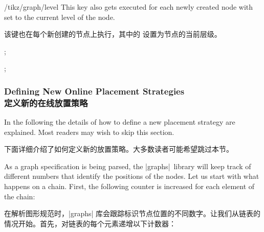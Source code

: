 \begin{stylekey}{/tikz/graph/level }
    This key also gets executed for each newly created node with 
    set to the current level of the node.
     
    该键也在每个新创建的节点上执行，其中的  设置为节点的当前层级。

    \begin{codeexample}[preamble={\usetikzlibrary{graphs}}]
\tikz {};
\end{codeexample}
\begin{codeexample}[preamble={\usetikzlibrary{graphs}}]
\tikz {};
\end{codeexample}
\end{stylekey}


\subsubsection{Defining New Online Placement Strategies\\定义新的在线放置策略}
\label{section-library-graphs-new-online}

In the following the details of how to define a new placement strategy are
explained. Most readers may wish to skip this section.

下面详细介绍了如何定义新的放置策略。大多数读者可能希望跳过本节。

As a graph specification is being parsed, the |graphs| library will keep track
of different numbers that identify the positions of the nodes. Let us start
with what happens on a chain. First, the following counter is increased for
each element of the chain:

在解析图形规范时，|graphs| 库会跟踪标识节点位置的不同数字。让我们从链表的情况开始。首先，对链表的每个元素递增以下计数器：

